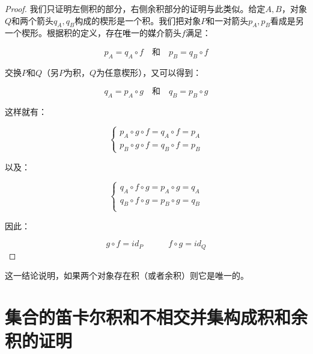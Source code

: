 \documentclass[UTF8]{article}
\begin{document}
\begin{proof}
我们只证明左侧积的部分，右侧余积部分的证明与此类似。给定$A, B$，对象$Q$和两个箭头$q_A, q_B$构成的楔形是一个积。我们把对象$P$和一对箭头$p_A, p_B$看成是另一个楔形。根据积的定义，存在唯一的媒介箭头$f$满足：

\[
p_A = q_A \circ f \quad \text{和} \quad p_B = q_B \circ f
\]

交换$P$和$Q$（另$P$为积，$Q$为任意楔形），又可以得到：

\[
q_A = p_A \circ g \quad \text{和} \quad q_B = p_B \circ g
\]

这样就有：

\[
\begin{cases}
p_A \circ g \circ f = q_A \circ f = p_A \\
p_B \circ g \circ f = q_B \circ f = p_B
\end{cases}
\]

以及：

\[
\begin{cases}
q_A \circ f \circ g = p_A \circ g = q_A \\
q_B \circ f \circ g = p_B \circ g = q_B \\
\end{cases}
\]

因此：

\[
g \circ f = id_P \quad \quad \quad f \circ g = id_Q
\]

\end{proof}

这一结论说明，如果两个对象存在积（或者余积）则它是唯一的。

\section{集合的笛卡尔积和不相交并集构成积和余积的证明}
\end{document}
